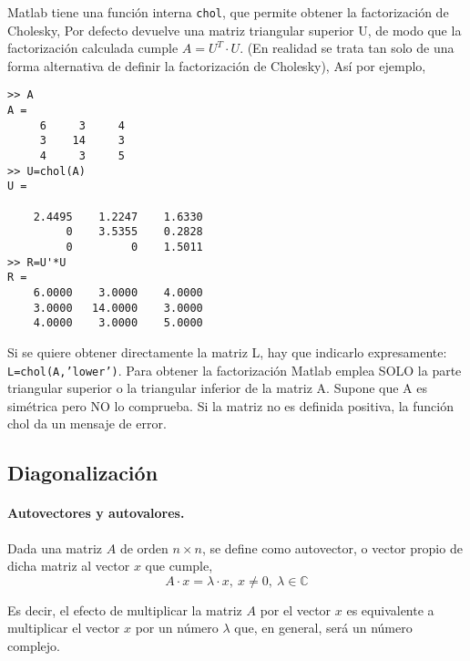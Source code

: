 Matlab tiene una función interna \texttt{chol}, que permite obtener la factorización de Cholesky, Por defecto devuelve una matriz triangular superior U, de modo que la factorización calculada cumple $A=U^T\cdot U$. (En realidad se trata tan solo de una forma alternativa de definir la factorización de Cholesky), Así por ejemplo,

\begin{verbatim}
>> A
A =
     6     3     4
     3    14     3
     4     3     5
>> U=chol(A)
U =

    2.4495    1.2247    1.6330
         0    3.5355    0.2828
         0         0    1.5011
>> R=U'*U
R =
    6.0000    3.0000    4.0000
    3.0000   14.0000    3.0000
    4.0000    3.0000    5.0000
\end{verbatim}
Si se quiere obtener directamente la matriz L, hay que indicarlo expresamente: \texttt{L=chol(A,'lower')}.
Para obtener la factorización Matlab emplea SOLO la parte triangular superior o la triangular inferior de la matriz A. Supone que A es simétrica pero NO lo comprueba.
Si la matriz no es definida positiva, la función chol da un mensaje de error.

\subsection{Diagonalización}\label{sec:diag}
\paragraph{Autovectores y autovalores.} Dada una matriz $A$ de orden $n\times n$, se define como autovector, o vector propio de dicha matriz al vector $x$ que cumple,
\begin{equation*}
A\cdot x =\lambda \cdot x, \  x\neq 0, \ \lambda \in \mathbb{C}
\end{equation*}

Es decir, el efecto de multiplicar la matriz $A$ por el vector $x$ es equivalente a multiplicar el vector $x$  por un número $\lambda$ que, en general, será un número complejo.

